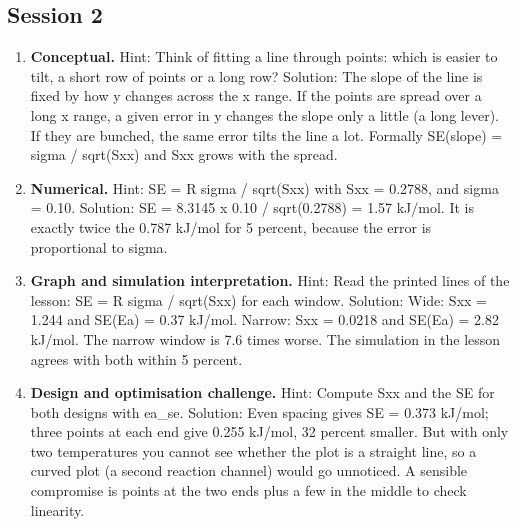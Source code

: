 \documentclass[11pt,a4paper]{article}
\begin{document}
\subsection*{Session 2}
\begin{enumerate}[nosep]
\item \textbf{Conceptual.} Hint: Think of fitting a line through points: which is easier to tilt, a short row of points or a long row? Solution: The slope of the line is fixed by how y changes across the x range. If the points are spread over a long x range, a given error in y changes the slope only a little (a long lever). If they are bunched, the same error tilts the line a lot. Formally SE(slope) = sigma / sqrt(Sxx) and Sxx grows with the spread.
\item \textbf{Numerical.} Hint: SE = R sigma / sqrt(Sxx) with Sxx = 0.2788, and sigma = 0.10. Solution: SE = 8.3145 x 0.10 / sqrt(0.2788) = 1.57 kJ/mol. It is exactly twice the 0.787 kJ/mol for 5 percent, because the error is proportional to sigma.
\item \textbf{Graph and simulation interpretation.} Hint: Read the printed lines of the lesson: SE = R sigma / sqrt(Sxx) for each window. Solution: Wide: Sxx = 1.244 and SE(Ea) = 0.37 kJ/mol. Narrow: Sxx = 0.0218 and SE(Ea) = 2.82 kJ/mol. The narrow window is 7.6 times worse. The simulation in the lesson agrees with both within 5 percent.
\item \textbf{Design and optimisation challenge.} Hint: Compute Sxx and the SE for both designs with ea\_se. Solution: Even spacing gives SE = 0.373 kJ/mol; three points at each end give 0.255 kJ/mol, 32 percent smaller. But with only two temperatures you cannot see whether the plot is a straight line, so a curved plot (a second reaction channel) would go unnoticed. A sensible compromise is points at the two ends plus a few in the middle to check linearity.
\end{enumerate}
\end{document}
